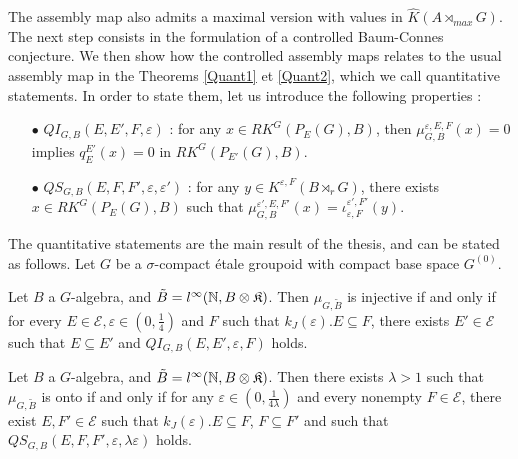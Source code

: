 The assembly map also admits a maximal version with values in $\hat K(A\rtimes_{max} G)$. \\ %

The next step consists in the formulation of a controlled Baum-Connes conjecture. We then show how the controlled assembly maps relates to the usual assembly map in the Theorems \ref{Quant1} et \ref{Quant2}, which we call quantitative statements. In order to state them, let us introduce the following properties :\\
\begin{itemize}
\item[$\bullet$] $QI_{G,B}(E,E',F,\varepsilon)$ : for any $x\in RK^G(P_E(G), B )$, then $\mu^{\varepsilon,E,F}_{G,B}(x) = 0$ implies $q_E^{E'}(x)=0$ in $RK^G(P_{E'}(G),B)$.
\item[$\bullet$] $QS_{G,B}(E,F,F',\varepsilon,\varepsilon')$ : for any $y\in K^{\varepsilon,F}(B\rtimes_r G)$, there exists $x\in RK^G(P_E(G),B)$ such that $\mu^{\varepsilon',E,F'}_{G,B}(x)=\iota_{\varepsilon,F}^{\varepsilon',F'}(y)$.\\
\end{itemize} 

The quantitative statements are the main result of the thesis, and can be stated as follows. Let $G$ be a $\sigma$-compact étale groupoid with compact base space $G^{(0)}$.

\begin{thm}
Let $B$ a $G$-algebra, and $\tilde B = l^\infty(\mathbb N,B\otimes \mathfrak K)$. Then $\mu_{G,\tilde B}$ is injective if and only if for every $E\in\mathcal E,\varepsilon\in(0,\frac{1}{4})$ and $F$ such that $k_J(\varepsilon).E\subseteq F$, there exists $E' \in\mathcal E$ such that $E\subseteq E'$ and $QI_{G,B}(E,E',\varepsilon,F)$ holds. 
\end{thm}

\begin{thm}
Let $B$ a $G$-algebra, and $\tilde B = l^\infty(\mathbb N,B\otimes \mathfrak K)$. Then there exists $\lambda>1$ such that $\mu_{G,\tilde B}$ is onto if and only if for any $\varepsilon\in ( 0 ,\frac{1}{4\lambda})$ and every nonempty $F\in\mathcal E$, there exist $E,F'\in\mathcal E$ such that  $k_J(\varepsilon) .E \subseteq F$, $F\subseteq F'$ and such that $QS_{G,B}(E,F,F',\varepsilon,\lambda\varepsilon)$ holds.
\end{thm}

